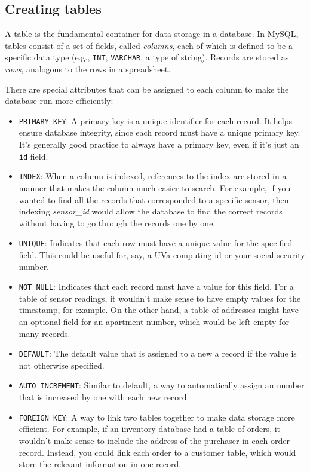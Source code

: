 \documentclass[11pt]{article} %
\begin{document}
\subsection*{Creating tables}

A table is the fundamental container for data storage in a database. In MySQL, tables consist of a set of fields, called \emph{columns}, each of which is defined to be a specific data type (e.g., \verb|INT|, \verb|VARCHAR|, a type of string). Records are stored as \emph{rows}, analogous to the rows in a spreadsheet.

There are special attributes that can be assigned to each column to make the database run more efficiently:

\begin{itemize}
\item \verb|PRIMARY KEY|: A primary key is a unique identifier for each record. It helps ensure database integrity, since each record must have a unique primary key. It’s generally good practice to always have a primary key, even if it’s just an \verb|id| field.
\item \verb|INDEX|: When a column is indexed, references to the index are stored in a manner that makes the column much easier to search. For example, if you wanted to find all the records that corresponded to a specific sensor, then indexing \emph{sensor\_id} would allow the database to find the correct records without having to go through the records one by one.
\item \verb|UNIQUE|: Indicates that each row must have a unique value for the specified field. This could be useful for, say, a UVa computing id or your social security number.
\item \verb|NOT NULL|: Indicates that each record must have a value for this field. For a table of sensor readings, it wouldn’t make sense to have empty values for the timestamp, for example. On the other hand, a table of addresses might have an optional field for an apartment number, which would be left empty for many records.
\item \verb|DEFAULT|: The default value that is assigned to a new a record if the value is not otherwise specified.
\item \verb|AUTO INCREMENT|: Similar to default, a way to automatically assign an number that is increased by one with each new record.
\item \verb|FOREIGN KEY|: A way to link two tables together to make data storage more efficient. For example, if an inventory database had a table of orders, it wouldn’t make sense to include the address of the purchaser in each order record. Instead, you could link each order to a customer table, which would store the relevant information in one record.
\end{itemize}
\end{document}
